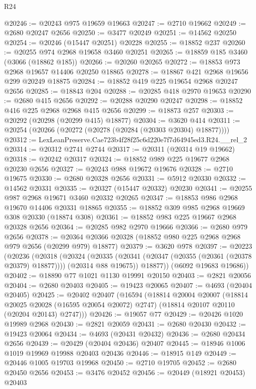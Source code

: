 \begin{lexlean}{R24}
\begin{coremodule}
@20246 := @20243 @975 @19659 @19663
@20247 := @2710 @19662
@20249 := @2680 @20247 @2656
@20250 := @3477 @20249
@20251 := @14562 @20250
@20254 := @20246 (@15447 @20251) @20228
@20255 := @18852 @237
@20260 := @20255 @974 @2968 @19658 @3460 @20251
@20265 := @18859 @185 @3460 (@3066 (@18862 @185))
@20266 := @20260 @20265
@20272 := @18853 @973 @2968 @19657 @14406 @20250 @18865
@20278 := @18867 @421 @2968 @19656 @299 @20249 @18875
@20284 := @18852 @419 @225 @19654 @2968 @20247 @2656
@20285 := @18843 @204
@20288 := @20285 @418 @2970 @19653
@20290 := @2680 @415 @2656
@20292 := @20288 @20290 @20247
@20298 := @18852 @416 @225 @2968 @2968 @415 @2656
@20299 := @18873 @257
@20303 := @20292 (@20298 (@20299 @415) @18877)
@20304 := @3620 @414
@20311 := @20254 (@20266 (@20272 (@20278 (@20284 (@20303 @20304) @18877))))
@20312 := LexLeanPreserve.Cae723b4f28f25c6d220e7f7d64945ed3.R24.__rel_2
@20314 := @20312 @2741 @2744
@20317 := @20311 (@20314 @19 @19662)
@20318 := @20242 @20317
@20324 := @18852 @989 @225 @19677 @2968 @20230 @2656
@20327 := @20243 @988 @19672 @19676
@20328 := @2710 @19675
@20330 := @2680 @20328 @2656
@20331 := @5912 @20330
@20332 := @14562 @20331
@20335 := @20327 (@15447 @20332) @20230
@20341 := @20255 @987 @2968 @19671 @3460 @20332 @20265
@20347 := @18853 @986 @2968 @19670 @14406 @20331 @18865
@20355 := @18852 @309 @985 @2968 @19669 @308 @20330 (@18874 @308)
@20361 := @18852 @983 @225 @19667 @2968 @20328 @2656
@20364 := @20285 @982 @2970 @19666
@20366 := @2680 @979 @2656
@20378 := @20364 @20366 @20328 (@18852 @980 @225 @2968 @2968 @979 @2656 (@20299 @979) @18877)
@20379 := @3620 @978
@20397 := @20223
    (@20236
      (@20318
        (@20324
          (@20335 (@20341 (@20347 (@20355 (@20361 (@20378 @20379) @18877)))) (@20314 @88 @19675))
          @18877))
      (@6092 @19683 @19686))
@20402 := @18890 @77 @1021 @1130 @19991 @20150
@20403 := @2821 @20056
@20404 := @2680 @20403
@20405 := @19423 @20065
@20407 := @4693 (@20404 @20405)
@20425 := @20402
    @20407
    (@16594
      (@18814
        @20004
        @20007
        (@18814 @20025 @20028 (@16595 @20054 @20072) @2747)
        (@18814 @20107 @20110 (@20204 @20143) @2747)))
@20426 := @19057 @77
@20429 := @20426 @1020 @19989 @2968
@20430 := @2821 @20059
@20431 := @2680 @20430
@20432 := @19423 @20064
@20434 := @4693 (@20431 @20432)
@20436 := @2680 @20434 @2656
@20439 := @20429 (@20404 @20436) @20407
@20445 := @18946 @1006 @1019 @19969 @19988 @20403 @20436
@20446 := @18915 @149
@20449 := @20446 @1005 @19703 @19968
@20450 := @2710 @19705
@20452 := @2680 @20450 @2656
@20453 := @3476 @20452
@20456 := @20449 (@18921 @20453) @20403

\end{coremodule}
\end{lexlean}
